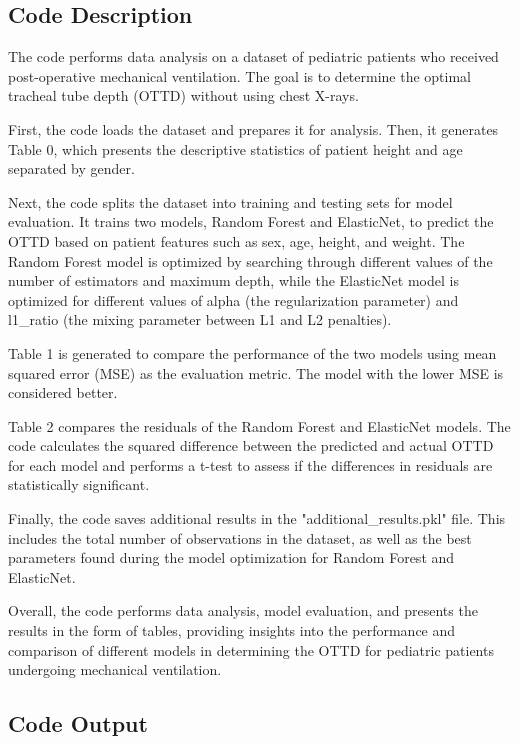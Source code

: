 \documentclass[11pt]{article}
\begin{document}
\subsection{Code Description}

The code performs data analysis on a dataset of pediatric patients who received post-operative mechanical ventilation. The goal is to determine the optimal tracheal tube depth (OTTD) without using chest X-rays.

First, the code loads the dataset and prepares it for analysis. Then, it generates Table 0, which presents the descriptive statistics of patient height and age separated by gender.

Next, the code splits the dataset into training and testing sets for model evaluation. It trains two models, Random Forest and ElasticNet, to predict the OTTD based on patient features such as sex, age, height, and weight. The Random Forest model is optimized by searching through different values of the number of estimators and maximum depth, while the ElasticNet model is optimized for different values of alpha (the regularization parameter) and l1\_ratio (the mixing parameter between L1 and L2 penalties).

Table 1 is generated to compare the performance of the two models using mean squared error (MSE) as the evaluation metric. The model with the lower MSE is considered better.

Table 2 compares the residuals of the Random Forest and ElasticNet models. The code calculates the squared difference between the predicted and actual OTTD for each model and performs a t-test to assess if the differences in residuals are statistically significant.

Finally, the code saves additional results in the "additional\_results.pkl" file. This includes the total number of observations in the dataset, as well as the best parameters found during the model optimization for Random Forest and ElasticNet.

Overall, the code performs data analysis, model evaluation, and presents the results in the form of tables, providing insights into the performance and comparison of different models in determining the OTTD for pediatric patients undergoing mechanical ventilation.

\subsection{Code Output}
\end{document}
